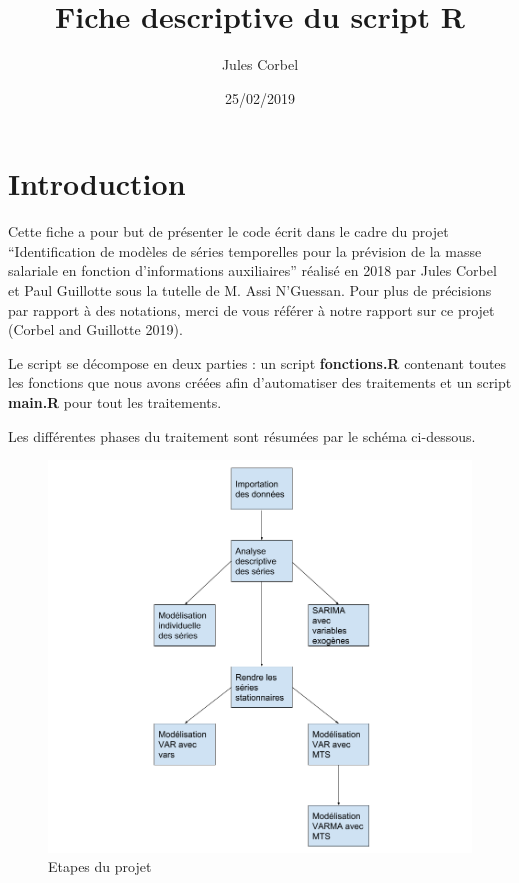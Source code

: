 \documentclass[12pt,]{article}
\title{Fiche descriptive du script R}
\author{Jules Corbel}
\date{25/02/2019}
\begin{document}
\maketitle

{
\setcounter{tocdepth}{2}
\tableofcontents
\clearpage
}
\section*{Introduction}\label{introduction}

Cette fiche a pour but de présenter le code écrit dans le cadre du
projet ``Identification de modèles de séries temporelles pour la
prévision de la masse salariale en fonction d'informations auxiliaires''
réalisé en 2018 par Jules Corbel et Paul Guillotte sous la tutelle de M.
Assi N'Guessan. Pour plus de précisions par rapport à des notations,
merci de vous référer à notre rapport sur ce projet (Corbel and
Guillotte 2019).

Le script se décompose en deux parties : un script \textbf{fonctions.R}
contenant toutes les fonctions que nous avons créées afin d'automatiser
des traitements et un script \textbf{main.R} pour tout les traitements.

Les différentes phases du traitement sont résumées par le schéma
ci-dessous.

\begin{figure}[htbp]
\centering
\includegraphics{figures/Schema_script.png}
\caption{Etapes du projet}
\end{figure}
\end{document}
